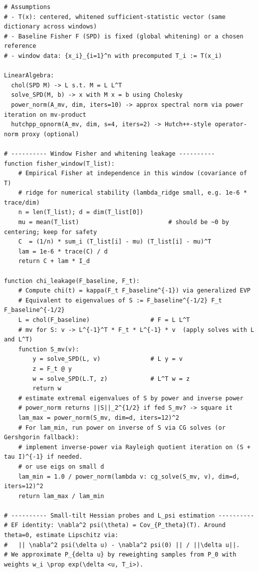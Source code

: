 \begin{lstlisting}
# Assumptions
# - T(x): centered, whitened sufficient-statistic vector (same dictionary across windows)
# - Baseline Fisher F (SPD) is fixed (global whitening) or a chosen reference
# - window data: {x_i}_{i=1}^n with precomputed T_i := T(x_i)

LinearAlgebra:
  chol(SPD M) -> L s.t. M = L L^T
  solve_SPD(M, b) -> x with M x = b using Cholesky
  power_norm(A_mv, dim, iters=10) -> approx spectral norm via power iteration on mv-product
  hutchpp_opnorm(A_mv, dim, s=4, iters=2) -> Hutch++-style operator-norm proxy (optional)

# ---------- Window Fisher and whitening leakage ----------
function fisher_window(T_list):
    # Empirical Fisher at independence in this window (covariance of T)
    # ridge for numerical stability (lambda_ridge small, e.g. 1e-6 * trace/dim)
    n = len(T_list); d = dim(T_list[0])
    mu = mean(T_list)                         # should be ~0 by centering; keep for safety
    C  = (1/n) * sum_i (T_list[i] - mu) (T_list[i] - mu)^T
    lam = 1e-6 * trace(C) / d
    return C + lam * I_d

function chi_leakage(F_baseline, F_t):
    # Compute chi(t) = kappa(F_t F_baseline^{-1}) via generalized EVP
    # Equivalent to eigenvalues of S := F_baseline^{-1/2} F_t F_baseline^{-1/2}
    L = chol(F_baseline)                 # F = L L^T
    # mv for S: v -> L^{-1}^T * F_t * L^{-1} * v  (apply solves with L and L^T)
    function S_mv(v):
        y = solve_SPD(L, v)              # L y = v
        z = F_t @ y
        w = solve_SPD(L.T, z)            # L^T w = z
        return w
    # estimate extremal eigenvalues of S by power and inverse power
    # power_norm returns ||S||_2^{1/2} if fed S_mv? -> square it
    lam_max = power_norm(S_mv, dim=d, iters=12)^2
    # For lam_min, run power on inverse of S via CG solves (or Gershgorin fallback):
    # implement inverse-power via Rayleigh quotient iteration on (S + tau I)^{-1} if needed.
    # or use eigs on small d
    lam_min = 1.0 / power_norm(lambda v: cg_solve(S_mv, v), dim=d, iters=12)^2 
    return lam_max / lam_min

# ---------- Small-tilt Hessian probes and L_psi estimation ----------
# EF identity: \nabla^2 psi(\theta) = Cov_{P_theta}(T). Around theta=0, estimate Lipschitz via:
#   || \nabla^2 psi(\delta u) - \nabla^2 psi(0) || / ||\delta u||.
# We approximate P_{delta u} by reweighting samples from P_0 with weights w_i \prop exp(\delta <u, T_i>).


\end{lstlisting}
